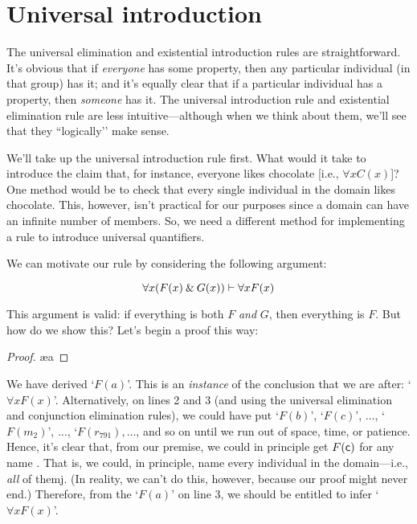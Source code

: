 \section{Universal introduction}

The universal elimination and existential introduction rules are straightforward. It's obvious that if \textit{everyone} has some property, then any particular individual (in that group) has it; and it's equally clear that if a particular individual has a property, then \textit{someone} has it.
The universal introduction rule and existential elimination rule are less intuitive---although when we think about them, we'll see that they ``logically’’ make sense. 

We'll take up the universal introduction rule first. What would it take to introduce the claim that, for instance, everyone likes chocolate [i.e., $\forall x C(x)$]? One method would be to check that every single individual in the domain likes chocolate. This, however, isn’t practical for our purposes since a domain can have an infinite number of members.
So, we need a different method for implementing a rule to introduce universal quantifiers.

We can motivate our rule by considering the following argument:

$$\forall x (F(x) \mathbin{\&} G(x)) \vdash \forall x F(x)$$

This argument is valid: if everything is both $F$ \emph{and} $G$, then everything is $F$.  But how do we show this?  Let's begin a proof this way:

\begin{proof}
	 \pr{}
	 
	 \ae{a}
\end{proof}
We have derived `$F(a)$'. This is an \textit{instance} of the conclusion that we are after: `$\forall xF(x)$'. Alternatively, on lines 2 and 3 (and using the universal elimination and conjunction elimination rules), we could have put `$F(b)$', `$F(c)$', $\ldots$, `$F(m_2)$', $\ldots$, `$F(r_{791}), \ldots$, and so on until we run out of space, time, or patience.   Hence, it's clear that, from our premise, we could in principle get $F(\mathsf{c})$ for any name . That is, we could, {in principle}, name every individual in the domain---i.e., \textit{all} of themj. (In reality, we can't do this, however, because our proof might never end.)
Therefore, from the `$F(a)$' on line 3,  we should be entitled to infer `$\forall x F(x)$'.  

